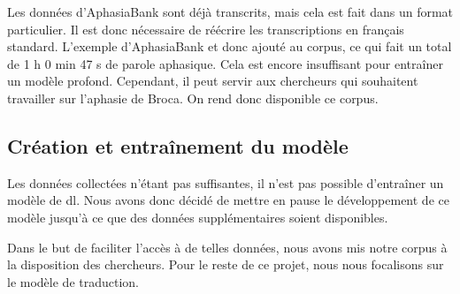 Les données d'AphasiaBank sont déjà transcrits, mais cela est fait dans un format particulier.
Il est donc nécessaire de réécrire les transcriptions en français standard.
L'exemple d'AphasiaBank et donc ajouté au corpus, ce qui fait un total de 1 h 0 min 47 s de parole aphasique.
Cela est encore insuffisant pour entraîner un modèle profond.
Cependant, il peut servir aux chercheurs qui souhaitent travailler sur l'aphasie de Broca.
On rend donc disponible ce corpus.

\subsection{Création et entraînement du modèle}

Les données collectées n'étant pas suffisantes,
il n'est pas possible d'entraîner un modèle de \gls{dl}.
Nous avons donc décidé de mettre en pause le développement de ce modèle 
jusqu'à ce que des données supplémentaires soient disponibles.

Dans le but de faciliter l'accès à de telles données,
nous avons mis notre corpus à la disposition des chercheurs.
Pour le reste de ce projet,
nous nous focalisons sur le modèle de traduction.